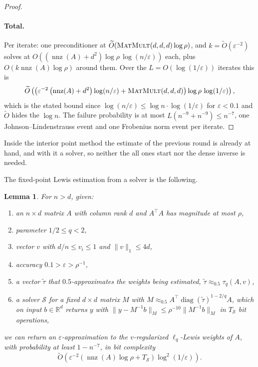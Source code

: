 \documentclass[11pt]{article}
\newtheorem{lemma}{Lemma}[section]
\newcommand{\R}{\mathbb R}
\newcommand{\diag}{\operatorname{diag}}
\newcommand{\nnz}{\operatorname{nnz}}
\newcommand{\MM}{\textsc{MatMult}}
\renewcommand{\O}{\widetilde O}
\newcommand{\tautil}{\widetilde{\tau}}
\begin{document}
\begin{proof}
\paragraph{Total.}
Per iterate: one preconditioner at $\O(\MM(d, d, d) \log \rho)$, and
$k = \O(\varepsilon^{-2})$ solves at
$O((\nnz(A) + d^{2}) \log \rho \, \log(n / \varepsilon))$ each, plus
$O(k \nnz(A) \log \rho)$ around them.
Over the $L = O(\log(1 / \varepsilon))$ iterates this is
\[
\O\left( \left( \varepsilon^{-2} \left( \nnz(A) + d^{2} \right)
\log(n / \varepsilon) + \MM(d, d, d) \right) \log \rho \, \log(1 / \varepsilon) \right) ,
\]
which is the stated bound since
$\log(n / \varepsilon) \le \log n \cdot \log(1 / \varepsilon)$ for
$\varepsilon < 0.1$ and
$\O$ hides the
$\log n$.
The failure probability is at most $L (n^{-9} + n^{-9}) \le n^{-7}$, one
Johnson--Lindenstrauss event and one Frobenius norm event per iterate.
\end{proof}

Inside the interior point method the estimate of the previous round is already
at hand, and with it a solver, so neither the all ones start nor the dense
inverse is needed.

The fixed-point Lewis estimation from a solver is the following.

\begin{lemma}
\label{lem:lewis}
For $n > d$, given:
\begin{enumerate}
\item \label{itm:lewis:1} an $n \times d$ matrix
  $A$ with column rank
  $d$ and
  $A^{\top} A$ has magnitude at most
  $\rho$,
\item \label{itm:lewis:2} parameter $1/2 \leq q < 2$,
\item \label{itm:lewis:3} vector $v$ with
  $d/n \le v_i \le 1$ and
  $\|v\|_1\le 4d$,
\item \label{itm:lewis:4} accuracy $0.1 > \varepsilon > \rho^{-1}$,
\item \label{itm:lewis:5} a vector $\tautil$ that
  $0.5$-approximates the weights being estimated,
  $\tautil \approx_{0.5} \tau_{q}(A, v)$,
\item \label{itm:lewis:6} a solver $\mathcal{S}$ for a fixed
  $d \times d$ matrix
  $M$ with
  $M \approx_{0.5} A^{\top} \diag(\tautil)^{1 - 2/q} A$, which on input
  $b \in \R^{d}$ returns
  $y$ with
  $\|y - M^{-1} b\|_{M} \le \rho^{-10} \|M^{-1} b\|_{M}$ in
  $T_{\mathcal{S}}$ bit operations,
\end{enumerate}
we can return an $\varepsilon$-approximation to the
$v$-regularized
$\ell_{q}$-Lewis weights of
$A$, with probability at least
$1 - n^{-7}$, in bit complexity
\[
\O\left( \varepsilon^{-2} \left( \nnz(A) \log \rho + T_{\mathcal{S}} \right)
\log^{2}(1 / \varepsilon) \right) .
\]
\end{lemma}
\end{document}
